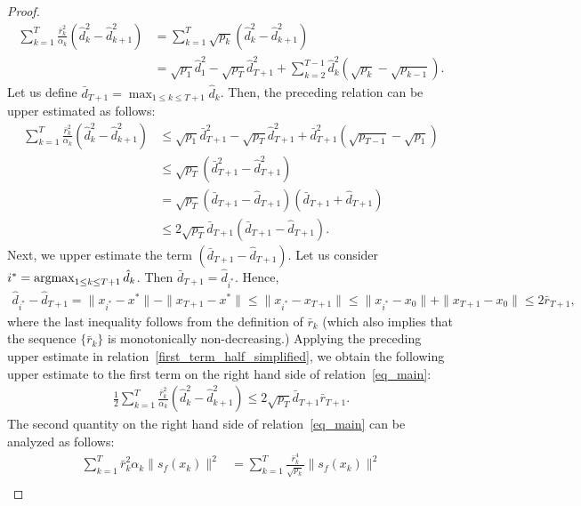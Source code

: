 \documentclass{article}
\def\argmax{\mathop{\rm argmax}}
\theoremstyle{plain}
\theoremstyle{definition}
\theoremstyle{remark}
\begin{document}
\begin{proof}
\begin{align*}
    \sum_{k=1}^{T} \frac{\bar{r}_k^2}{\alpha_k} \left(\hat d_k^2 - \hat d_{k+1}^2 \right)
    &= \sum_{k=1}^{T} \sqrt{p_k} \left(\hat d_k^2 - \hat d_{k+1}^2 \right) \\
    &= \sqrt{p_1} \hat{d}_1^2 - \sqrt{p_T} \hat{d}_{T+1}^2 + \sum_{k=2}^{T-1} \hat{d}_k^2 (\sqrt{p_k} - \sqrt{p_{k-1}}) .
\end{align*}
Let us define $\bar d_{T+1} = \max_{1 \leq k \leq T+1} \hat d_k$. Then, the preceding relation can be upper estimated as follows:
\begin{align}
    \sum_{k=1}^{T} \frac{\bar{r}_k^2}{\alpha_k} \left(\hat d_k^2 - \hat d_{k+1}^2 \right) &\leq \sqrt{p_1} \bar d_{T+1}^2 - \sqrt{p_T} \hat{d}_{T+1}^2 + \bar d_{T+1}^2 (\sqrt{p_{T-1}} - \sqrt{p_1}) \nonumber\\
    &\leq \sqrt{p_T} (\bar d_{T+1}^2 - \hat{d}_{T+1}^2) \nonumber\\
    &= \sqrt{p_T} (\bar d_{T+1} - \hat{d}_{T+1}) (\bar d_{T+1} + \hat{d}_{T+1}) \nonumber\\
    &\leq 2 \sqrt{p_T} \bar d_{T+1} (\bar d_{T+1} - \hat{d}_{T+1}) . \label{first_term_half_simplified}
\end{align}
Next, we  upper estimate the term $(\bar d_{T+1} - \hat{d}_{T+1})$. Let us consider $i^* = \argmax_{1 \leq k \leq T+1} \hat d_k$. Then $\bar d_{T+1} = \hat d_{i^*}$. Hence, 
\begin{align*}
    \hat d_{i^*} - \hat{d}_{T+1} = \|x_{i^*} - x^*\| - \|x_{T+1} - x^*\| \leq \|x_{i^*} - x_{T+1}\| \leq \|x_{i^*} - x_0\| + \|x_{T+1} - x_0\| \leq 2 \bar r_{T+1},
\end{align*}
where the last inequality follows from the definition of $\bar r_k$ (which also implies that the sequence $\{\bar r_k\}$ is monotonically non-decreasing.) Applying the preceding upper estimate in relation~\eqref{first_term_half_simplified}, we obtain the following upper estimate to the first term on the right hand side of relation~\eqref{eq_main}:
\begin{align}
    \frac{1}{2} \sum_{k=1}^{T} \frac{\bar{r}_k^2}{\alpha_k} \left(\hat d_k^2 - \hat d_{k+1}^2 \right) \leq 2 \sqrt{p_{T}} \bar d_{T+1} \bar r_{T+1} . \label{first_term_simplified}
\end{align}
The second quantity on the right hand side of relation~\eqref{eq_main} can be analyzed as follows:
\begin{align}
    \sum_{k=1}^{T} \bar{r}_k^2 \alpha_k \| s_f(x_k) \|^2
&= \sum_{k=1}^{T} \frac{\bar{r}_k^4}{\sqrt{p_k}} \| s_f(x_k) \|^2 \nonumber\\

\end{align}
\end{proof}
\end{document}
